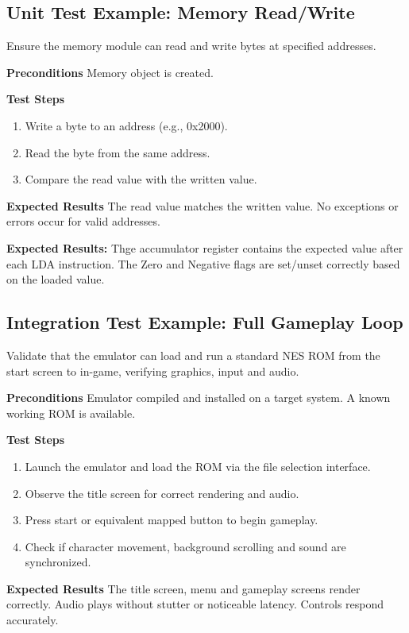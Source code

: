 \documentclass[a4paper, 11pt]{article}
\begin{document}
\subsection{Unit Test Example: Memory Read/Write}
Ensure the memory module can read and write bytes at specified addresses.

\textbf{Preconditions}
Memory object is created.

\textbf{Test Steps}
\begin{enumerate}
    \item Write a byte to an address (e.g., 0x2000).
    \item Read the byte from the same address.
    \item Compare the read value with the written value.
\end{enumerate}

\textbf{Expected Results}
The read value matches the written value. No exceptions or errors occur for valid addresses.

\textbf{Expected Results:}
Thge accumulator register contains the expected value after each LDA instruction. The Zero and Negative flags are set/unset correctly based on the loaded value.

\subsection{Integration Test Example: Full Gameplay Loop}
Validate that the emulator can load and run a standard NES ROM from the start  screen to in-game, verifying graphics, input and audio.

\textbf{Preconditions}
Emulator compiled and installed on a target system. A known working ROM is available.

\textbf{Test Steps}
\begin{enumerate}
    \item Launch the emulator and load the ROM via the file selection interface.
    \item Observe the title screen for correct rendering and audio.
    \item Press start or equivalent mapped button to begin gameplay.
    \item Check if character movement, background scrolling and sound are synchronized.
\end{enumerate}

\textbf{Expected Results}
The title screen, menu and gameplay screens render correctly. Audio plays without stutter or noticeable latency. Controls respond accurately.
\end{document}
